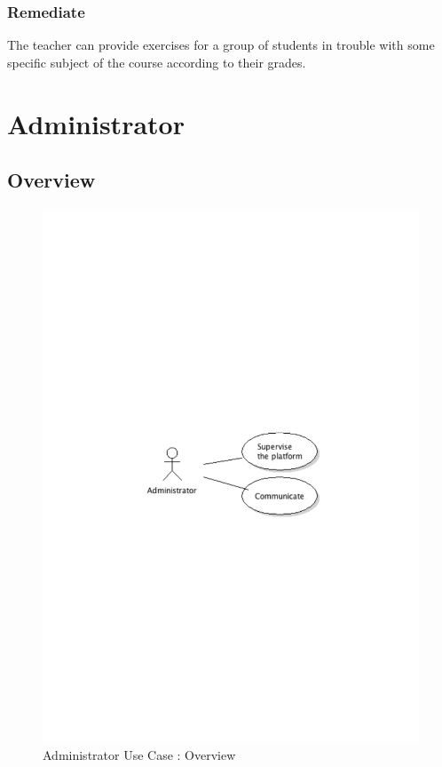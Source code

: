 		\subsubsection{Remediate}
			The teacher can provide exercises for a group of students in trouble with some specific subject of the course according to their grades.
\newpage
\section{Administrator}
	\subsection{Overview}
		\begin{figure}[ht]
			\begin{center}
				\includegraphics[width=\textwidth, trim=2cm 12cm 2cm 12cm]{UML_figure/UC/administrator/UC_Administrator_General.pdf}
				\caption{Administrator Use Case : Overview}
			\end{center}
		\end{figure}
